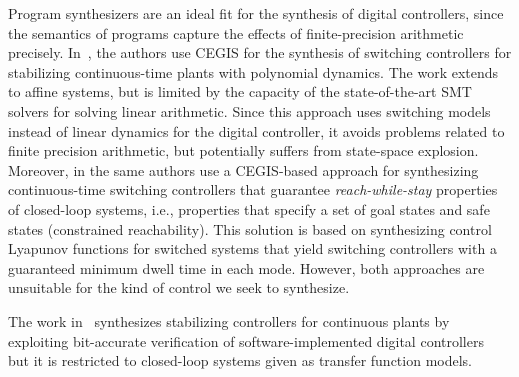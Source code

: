 \documentclass[sigconf]{llncs}
\begin{document}
Program synthesizers are an ideal fit for the synthesis of digital
controllers, since the semantics of programs capture the effects of
finite-precision arithmetic precisely. 
In~\cite{DBLP:conf/cdc/RavanbakhshS15}, the authors use CEGIS for the
synthesis of switching controllers for stabilizing continuous-time plants
with polynomial dynamics.  The work extends to affine systems, but is
limited by the capacity of the state-of-the-art SMT solvers for solving
linear arithmetic.  Since this approach uses switching models instead of
linear dynamics for the digital controller, it avoids problems related to
finite precision arithmetic, but potentially suffers from state-space
explosion.  Moreover, in \cite{DBLP:conf/emsoft/RavanbakhshS16} the same
authors use a CEGIS-based approach for synthesizing continuous-time
switching controllers that guarantee \emph{reach-while-stay} properties of
closed-loop systems, i.e., properties that specify a set of goal states and
safe states (constrained reachability).  This solution is based on
synthesizing control Lyapunov functions for switched systems that yield
switching controllers with a guaranteed minimum dwell time in each mode. 
However, both approaches are unsuitable for the kind of control we seek to
synthesize.

The work in~\cite{hscc-paper} synthesizes stabilizing controllers for
continuous plants
by exploiting bit-accurate verification of software-implemented
digital controllers~\cite{Bessa16} but it is restricted to closed-loop
systems given as transfer function models.

\end{document}
